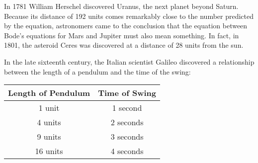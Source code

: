 \documentclass[fleqn,addpoints]{exam}
\begin{document}
\begin{questions}

    In 1781 William Herschel discovered Uranus, the next planet beyond Saturn.  Because its distance
    of 192 units comes remarkably close to the number predicted by the equation, astronomers came to
    the conclusion that the equation between Bode's equations for Mars and Jupiter must also mean
    something.  In fact, in 1801, the asteroid Ceres was discovered at a distance of 28 units from
    the sun.

    \question

    In the late sixteenth century, the Italian scientist Galileo discovered a relationship between
    the length of a pendulum and the time of the swing:

    \vspace{0.5 cm}
      \begin{tabular}{|c|c|}
        \hline
        Length of Pendulum  & Time of Swing \\ 
        \hline
        1 unit  & 1 second \\
        4 units & 2 seconds \\
        9 units & 3 seconds \\
        16 units & 4 seconds \\
        \hline
      \end{tabular}
    \vspace{0.5 cm}

\end{questions}
\end{document}

